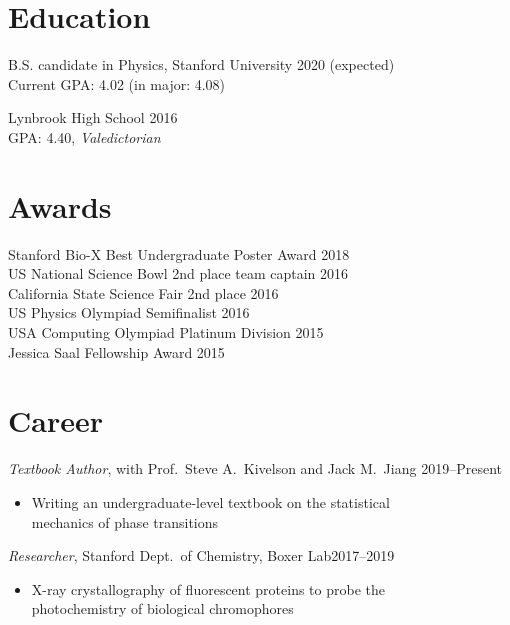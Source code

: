 \documentclass[margin]{res}
\newenvironment{myitemize}
{ \vspace{-1.5\topsep} \begin{itemize} }
{ \end{itemize} \vspace{-1.0\topsep}}
\begin{document}
\address{jeffjar@stanford.edu --- \url{https://stanford.edu/~jeffjar}}

\begin{resume}

\section{Education}

B.S. candidate in Physics, Stanford University \hfill 2020 (expected) \\
Current GPA: 4.02 (in major: 4.08)
 
Lynbrook High School \hfill 2016 \\
GPA: 4.40, \textit{Valedictorian}

\section{Awards}
 
Stanford Bio-X Best Undergraduate Poster Award \hfill 2018 \\
US National Science Bowl 2nd place team captain \hfill 2016 \\
California State Science Fair 2nd place \hfill 2016 \\
US Physics Olympiad Semifinalist \hfill 2016 \\
USA Computing Olympiad Platinum Division \hfill 2015 \\
Jessica Saal Fellowship Award \hfill 2015

\section{Career}

\textit{Textbook Author}, with Prof.\ Steve A.\ Kivelson and Jack M.\ Jiang  \hfill 2019--Present \\
\begin{myitemize}
    \item Writing an undergraduate-level textbook on the statistical\\
        mechanics of phase transitions
\end{myitemize}

\textit{Researcher}, Stanford Dept.\ of Chemistry, Boxer Lab\hfill 2017--2019 \\
\begin{myitemize}
    \item X-ray crystallography of fluorescent proteins to probe the\\ photochemistry of biological chromophores
\end{myitemize}


\end{resume}
\end{document}

